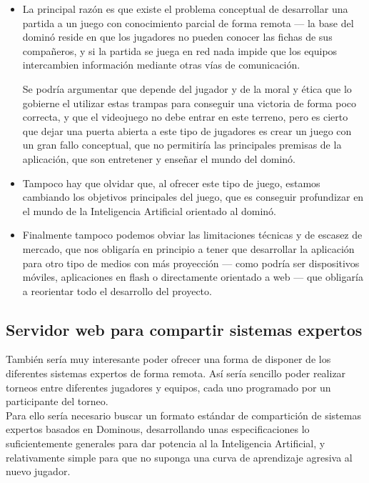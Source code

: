 \begin{itemize}
    \item La principal razón es que existe el problema conceptual de desarrollar una partida a un juego con conocimiento parcial 
        de forma remota --- la base del dominó reside en que los jugadores no pueden conocer las fichas de sus compañeros,
        y si la partida se juega en red nada impide que los equipos intercambien información mediante otras vías de
        comunicación.

        Se podría argumentar que depende del jugador y de la moral y ética que lo gobierne el utilizar estas trampas
        para conseguir una victoria de forma poco correcta, y que el videojuego no debe entrar en este terreno, pero
        es cierto que dejar una puerta abierta a este tipo de jugadores es crear un juego con un gran fallo conceptual,
        que no permitiría las principales premisas de la aplicación, que son entretener y enseñar el mundo del dominó.

    \item Tampoco hay que olvidar que, al ofrecer este tipo de juego, estamos cambiando los objetivos principales del
        juego, que es conseguir profundizar en el mundo de la Inteligencia Artificial orientado al dominó.

    \item Finalmente tampoco podemos obviar las limitaciones técnicas y de escasez de mercado, que nos obligaría en
        principio a tener que desarrollar la aplicación para otro tipo de medios con más proyección --- como podría
        ser dispositivos móviles, aplicaciones en flash o directamente orientado a web --- que obligaría a reorientar
        todo el desarrollo del proyecto.
\end{itemize}

\subsection{Servidor web para compartir sistemas expertos}

También sería muy interesante poder ofrecer una forma de disponer de los diferentes sistemas expertos de forma remota.
Así sería sencillo poder realizar torneos entre diferentes jugadores y equipos, cada uno programado por un participante
del torneo. \\

Para ello sería necesario buscar un formato estándar de compartición de sistemas expertos basados en Dominous, desarrollando
unas especificaciones lo suficientemente generales para dar potencia al la Inteligencia Artificial, y relativamente
simple para que no suponga una curva de aprendizaje agresiva al nuevo jugador. \\

